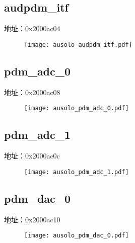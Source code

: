 \subsection{audpdm\_itf}
\label{ausolo-audpdm-itf}
地址：0x2000ac04
 \begin{figure}[H]
\texttt{[image: ausolo\_audpdm\_itf.pdf]}
\end{figure}

\subsection{pdm\_adc\_0}
\label{ausolo-pdm-adc-0}
地址：0x2000ac08
 \begin{figure}[H]
\texttt{[image: ausolo\_pdm\_adc\_0.pdf]}
\end{figure}

\subsection{pdm\_adc\_1}
\label{ausolo-pdm-adc-1}
地址：0x2000ac0c
 \begin{figure}[H]
\texttt{[image: ausolo\_pdm\_adc\_1.pdf]}
\end{figure}

\subsection{pdm\_dac\_0}
\label{ausolo-pdm-dac-0}
地址：0x2000ac10
 \begin{figure}[H]
\texttt{[image: ausolo\_pdm\_dac\_0.pdf]}
\end{figure}

